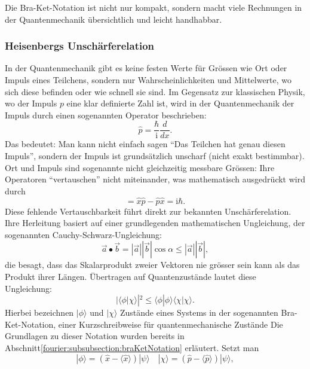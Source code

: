 Die Bra-Ket-Notation ist nicht nur kompakt, sondern macht viele Rechnungen in der Quantenmechanik übersichtlich und leicht handhabbar.

\subsubsection{Heisenbergs Unschärferelation%
\label{fourier:subsubsection:unschaerferelation}}
In der Quantenmechanik gibt es keine festen Werte für Grössen wie Ort oder Impuls eines Teilchens, sondern nur Wahrscheinlichkeiten und Mittelwerte, wo sich diese befinden oder wie schnell sie sind.
Im Gegensatz zur klassischen Physik, wo der Impuls $p$ eine klar definierte Zahl ist, wird in der Quantenmechanik der Impuls durch einen sogenannten Operator beschrieben:
\begin{equation}
	\hat{p} = \frac{\hbar}{\mathrm{i}} \frac{d}{dx}.
\end{equation}
Das bedeutet:
Man kann nicht einfach sagen ``Das Teilchen hat genau diesen Impuls'', sondern der Impuls ist grundsätzlich unscharf (nicht exakt bestimmbar).
Ort und Impuls sind sogenannte nicht gleichzeitig messbare Grössen:
Ihre Operatoren ``vertauschen'' nicht miteinander, was mathematisch ausgedrückt wird durch
\begin{equation}
	[\hat{x},\hat{p}] = \hat{x} \hat{p} - \hat{p} \hat{x} = \mathrm{i} \hbar.
\end{equation}
Diese fehlende Vertauschbarkeit führt direkt zur bekannten Unschärferelation.
Ihre Herleitung basiert auf einer grundlegenden mathematischen Ungleichung, der sogenannten Cauchy-Schwarz-Ungleichung:
\begin{equation}
	\vec{a} \bullet \vec{b} = |\vec{a}| |\vec{b}|\cos\alpha \le |\vec{a}| |\vec{b}|,
\end{equation} 
die besagt, dass das Skalarprodukt zweier Vektoren nie grösser sein kann als das Produkt ihrer Längen.
Übertragen auf Quantenzustände lautet diese Ungleichung:
\begin{equation}
	|\langle\phi | \chi\rangle|^2 \le \langle\phi | \phi\rangle \langle\chi | \chi\rangle.
\end{equation}
Hierbei bezeichnen $| \phi \rangle$ und $| \chi \rangle$ Zustände eines Systems in der sogenannten Bra-Ket-Notation, einer Kurzschreibweise für quantenmechanische Zustände
Die Grundlagen zu dieser Notation wurden bereits in Abschnitt\ref{fourier:subsubsection:braKetNotation} erläutert.
Setzt man
\begin{equation}
	|\phi\rangle = (\hat{x} - \langle \hat{x} \rangle) |\psi\rangle \quad |\chi\rangle = (\hat{p} - \langle \hat{p} \rangle) | \psi\rangle,
\end{equation}
